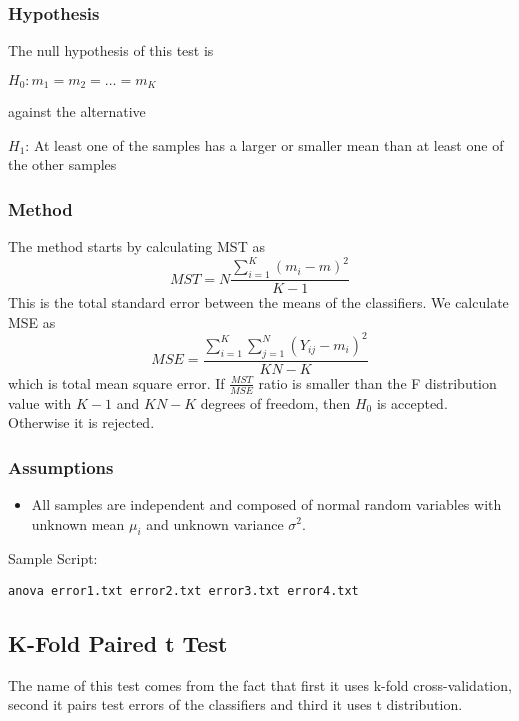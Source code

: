 \documentclass[a4paper,12pt]{book}
\begin{document}
\subsubsection{Hypothesis}
The null hypothesis of this test is  
\begin{center}
$H_0: m_1=m_2=\ldots=m_K$
\end{center}
against the alternative
\begin{center}
$H_1$: At least one of the samples has a larger or smaller mean than at least one of the other
samples
\end{center}

\subsubsection{Method}
The method starts by calculating MST as
\begin{equation}
MST=N\frac{\sum_{i=1}^K(m_i-m)^2}{K-1}
\end{equation}
This is the total standard error between the means of the classifiers. We calculate MSE as
\begin{equation}
MSE=\frac{\sum_{i=1}^K\sum_{j=1}^N(Y_{ij}-m_i)^2}{KN-K}
\end{equation}
which is total mean square error. If $\frac{MST}{MSE}$ ratio is smaller than the F distribution value with $K-1$ and $KN-K$ degrees of freedom, then $H_0$ is accepted. Otherwise it is rejected.

\subsubsection{Assumptions}
\begin{itemize}
\item All samples are independent and composed of normal random variables with unknown mean $\mu_i$
and unknown variance $\sigma^2$.
\end{itemize}

Sample Script:
\begin{verbatim}
anova error1.txt error2.txt error3.txt error4.txt
\end{verbatim}

\subsection{K-Fold Paired t Test}
The name of this test comes from the fact that first it uses k-fold cross-validation, second it pairs test errors of the classifiers and third it uses t distribution.
\end{document}
